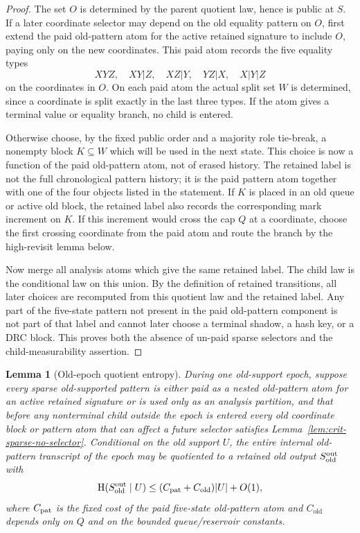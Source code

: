 \documentclass[11pt]{article}
\newtheorem{lemma}[theorem]{Lemma}
\theoremstyle{remark}
\newcommand{\HH}{\mathrm H}
\newcommand{\old}{\mathrm{old}}
\begin{document}
\begin{proof}
The set $O$ is determined by the parent quotient law, hence is public at $S$.  If a later coordinate selector may depend on the old equality pattern on $O$, first extend the paid old-pattern atom for the active retained signature to include $O$, paying only on the new coordinates.  This paid atom records the five equality types
\[
XYZ,\quad XY|Z,\quad XZ|Y,\quad YZ|X,\quad X|Y|Z
\]
on the coordinates in $O$.  On each paid atom the actual split set $W$ is determined, since a coordinate is split exactly in the last three types.  If the atom gives a terminal value or equality branch, no child is entered.

Otherwise choose, by the fixed public order and a majority role tie-break, a nonempty block $K\subseteq W$ which will be used in the next state.  This choice is now a function of the paid old-pattern atom, not of erased history.  The retained label is not the full chronological pattern history; it is the paid pattern atom together with one of the four objects listed in the statement.  If $K$ is placed in an old queue or active old block, the retained label also records the corresponding mark increment on $K$.  If this increment would cross the cap $Q$ at a coordinate, choose the first crossing coordinate from the paid atom and route the branch by the high-revisit lemma below.

Now merge all analysis atoms which give the same retained label.  The child law is the conditional law on this union.  By the definition of retained transitions, all later choices are recomputed from this quotient law and the retained label.  Any part of the five-state pattern not present in the paid old-pattern component is not part of that label and cannot later choose a terminal shadow, a hash key, or a DRC block.  This proves both the absence of un-paid sparse selectors and the child-measurability assertion.
\end{proof}

\begin{lemma}[Old-epoch quotient entropy]\label{lem:crit-old-entropy}
During one old-support epoch, suppose every sparse old-supported pattern is either paid as a nested old-pattern atom for an active retained signature or is used only as an analysis partition, and that before any nonterminal child outside the epoch is entered every old coordinate block or pattern atom that can affect a future selector satisfies Lemma~\ref{lem:crit-sparse-no-selector}.  Conditional on the old support $U$, the entire internal old-pattern transcript of the epoch may be quotiented to a retained old output $S_{\old}^{\rm out}$ with
\[
        \HH(S_{\old}^{\rm out}\mid U)
        \le (C_{\rm pat}+C_{\old})|U|+O(1),
\]
where $C_{\rm pat}$ is the fixed cost of the paid five-state old-pattern atom and $C_{\old}$ depends only on $Q$ and on the bounded queue/reservoir constants.
\end{lemma}
\end{document}
